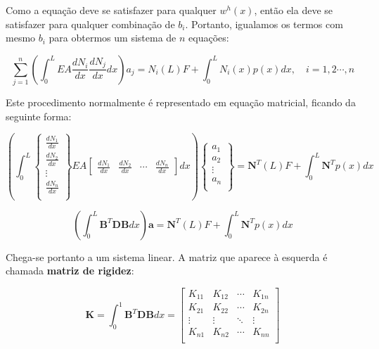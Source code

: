        Como a equação deve se satisfazer para qualquer $w^h(x)$, então ela deve se satisfazer para qualquer combinação de $b_i$. Portanto, igualamos os termos com mesmo $b_i$ para obtermos um sistema de $n$ equações:

        \begin{equation*}
            \sum_{j=1}^n \left(\int_0^L EA \frac{dN_i}{dx} \frac{dN_j}{dx} dx\right) a_j = N_i(L) F + \int_0^L N_i(x) p(x) dx, \quad i=1,2\cdots, n
        \end{equation*}

        Este procedimento normalmente é representado em equação matricial, ficando da seguinte forma:

        \begin{equation*}
            \left(\int_0^L 
            \begin{Bmatrix}
            \frac{dN_1}{dx}\\
            \frac{dN_2}{dx}\\
            \vdots\\
            \frac{dN_n}{dx}\\
            \end{Bmatrix}
            EA
            \begin{bmatrix}
            \frac{dN_1}{dx} &
            \frac{dN_2}{dx} &
            \cdots &
            \frac{dN_n}{dx}
            \end{bmatrix} dx\right) \begin{Bmatrix}
            a_1\\
            a_2\\
            \vdots\\
            a_n\\
            \end{Bmatrix} = \mathbf{N}^T(L) F + \int_0^L \mathbf{N}^T p(x) dx
        \end{equation*}

        \begin{equation*}
            \left(\int_0^L 
            \mathbf{B}^T
            \mathbf{D}
            \mathbf{B} dx \right)
            \mathbf{a} = \mathbf{N}^T(L) F + \int_0^L \mathbf{N}^T p(x) dx
        \end{equation*}


        Chega-se portanto a um sistema linear. A matriz que aparece à esquerda é chamada \textbf{matriz de rigidez}:

        \begin{equation}
            \mathbf{K} = \int_0^1 
            \mathbf{B}^T
            \mathbf{D}
            \mathbf{B} dx = 
            \begin{bmatrix}
                K_{11} & K_{12} & \cdots & K_{1n}\\
                K_{21} & K_{22} & \cdots & K_{2n}\\
                \vdots & \vdots & \ddots & \vdots\\
                K_{n1} & K_{n2} & \cdots & K_{nn}\\
            \end{bmatrix}
        \end{equation}

